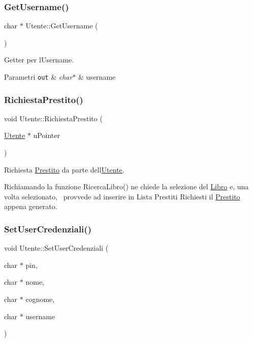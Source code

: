 \subsubsection{\texorpdfstring{Get\+Username()}{GetUsername()}}
{\footnotesize\ttfamily char $\ast$ Utente\+::\+Get\+Username (\begin{DoxyParamCaption}{ }\end{DoxyParamCaption})}



Getter per l\textquotesingle{}Username. 


\begin{DoxyParams}[1]{Parametri}
\mbox{\tt out}  & {\em char$\ast$} & username \\
\hline
\end{DoxyParams}
\mbox{\label{class_utente_a6041323415b0cb311ab2564afdd6a13b}} 
\subsubsection{\texorpdfstring{Richiesta\+Prestito()}{RichiestaPrestito()}}
{\footnotesize\ttfamily void Utente\+::\+Richiesta\+Prestito (\begin{DoxyParamCaption}\item[{\mbox{\hyperlink{class_utente}{Utente}} $\ast$}]{u\+Pointer }\end{DoxyParamCaption})}



Richiesta \mbox{\hyperlink{class_prestito}{Prestito}} da parte dell\textquotesingle{}\mbox{\hyperlink{class_utente}{Utente}}. 

Richiamando la funzione Ricerca\+Libro() ne chiede la selezione del \mbox{\hyperlink{class_libro}{Libro}} e, una volta selezionato,~\newline
provvede ad inserire in Lista Prestiti Richiesti il \mbox{\hyperlink{class_prestito}{Prestito}} appena generato. \mbox{\label{class_utente_a42d4d04d073063464cf24d74723c0ba8}} 
\subsubsection{\texorpdfstring{Set\+User\+Credenziali()}{SetUserCredenziali()}}
{\footnotesize\ttfamily void Utente\+::\+Set\+User\+Credenziali (\begin{DoxyParamCaption}\item[{char $\ast$}]{pin,  }\item[{char $\ast$}]{nome,  }\item[{char $\ast$}]{cognome,  }\item[{char $\ast$}]{username }\end{DoxyParamCaption})}



